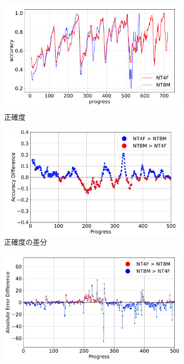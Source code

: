 \begin{figure}[t]
\centering
\begin{subfigure}[b]{0.49\linewidth}
    \includegraphics[width=\linewidth]{pdf/compare/EXP6_NT4F_and_NT8M/accuracy.pdf}
    \caption{正確度}
    \label{fig:EXP6_:NT4F_and_NT8M_accuracy}
\end{subfigure}
\begin{subfigure}[b]{0.49\linewidth}
    \includegraphics[width=\linewidth]{pdf/compare/EXP6_NT4F_and_NT8M/acc_diff_plot.pdf}
    \caption{正確度の差分}
    \label{fig:EXP6_NT4F_and_NT8M_acc_diff}
\end{subfigure}
\begin{subfigure}[b]{0.49\linewidth}
    \includegraphics[width=\linewidth]{pdf/compare/EXP6_NT4F_and_NT8M/error_abs_diff_plot.pdf}

\end{subfigure}
\end{figure}
